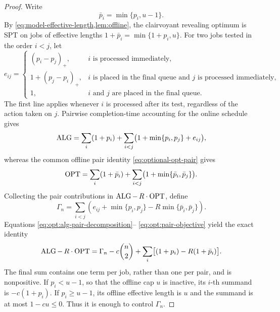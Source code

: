 \begin{proof}
Write
\[
 \bar p_i=\min\{p_i,u-1\}.
\]
By \cref{eq:model-effective-length,lem:offline}, the clairvoyant revealing
optimum is SPT on jobs of effective lengths
$1+\bar p_i=\min\{1+p_i,u\}$.  For two jobs tested in the order $i<j$, let
\begin{equation}
 e_{ij}=
 \begin{cases}
  (p_i-p_j)_+,
     &i\text{ is processed immediately},\\
  1+(p_j-p_i)_+,
     &i\text{ is placed in the final queue and }j\text{ is processed immediately},\\
  1,
     &i\text{ and }j\text{ are placed in the final queue}.
 \end{cases}
 \label{eq:opt:pair-excess}
\end{equation}
The first line applies whenever $i$ is processed after its test, regardless
of the action taken on $j$.  Pairwise completion-time accounting for the online
schedule gives
\begin{equation}
 \operatorname{ALG}
 =\sum_i(1+p_i)
   +\sum_{i<j}\bigl(1+\min\{p_i,p_j\}+e_{ij}\bigr),
 \label{eq:opt:alg-pair-decomposition}
\end{equation}
whereas the common offline pair identity \cref{eq:optional-opt-pair} gives
\begin{equation}
 \operatorname{OPT}
 =\sum_i(1+\bar p_i)
   +\sum_{i<j}\bigl(1+\min\{\bar p_i,\bar p_j\}\bigr).
 \label{eq:opt:opt-pair-decomposition}
\end{equation}
Collecting the pair contributions in $\operatorname{ALG}-\,R\cdot\operatorname{OPT}$, define
\begin{equation}
 \Gamma_n=\sum_{i<j}
 \left(e_{ij}+\min\{p_i,p_j\}
       -R\min\{\bar p_i,\bar p_j\}\right).
 \label{eq:opt:pair-objective}
\end{equation}
Equations \eqref{eq:opt:alg-pair-decomposition}--%
\eqref{eq:opt:pair-objective} yield the exact identity
\begin{equation}
 \operatorname{ALG}-\,R\cdot\operatorname{OPT}
 =\Gamma_n-c\binom n2
  +\sum_i\bigl[(1+p_i)-R(1+\bar p_i)\bigr].
 \label{eq:opt:gap-decomposition}
\end{equation}
The final sum contains one term per job, rather than one per pair, and is
nonpositive.  If $p_i<u-1$, so that the offline cap $u$ is inactive, its
$i$-th summand is $-c(1+p_i)$.  If $p_i\ge u-1$, its offline effective
length is $u$ and the summand is at most $1-cu\le0$.  Thus it is enough to
control $\Gamma_n$.


\end{proof}
